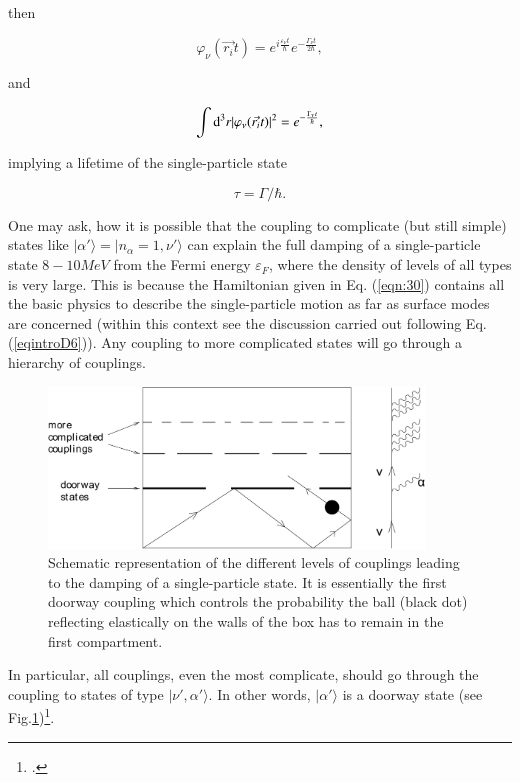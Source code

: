\noindent then

\begin{equation}
\nonumber
\varphi_{\nu}(\vec{r_i} t) = e^{i \frac{\varepsilon_{\nu} t}{\hbar}} e^{- \frac{\Gamma_{\nu} t}{2\hbar}} ,
\end{equation}

\noindent and

\begin{equation}
\int{\rm d}^3 r |\varphi_{\nu} (\vec{r_i} t)|^2 = e^{- \frac{\Gamma_{\nu} t}{\hbar}} ,
\label{eqn:44b}
\end{equation}

\noindent implying a lifetime of the single-particle state

\begin{equation}
\tau = \Gamma/\hbar .
\label{eqn:45}
\end{equation}

One may ask, how it is possible that the coupling to complicate (but still simple) states like $|\alpha'\rangle = |n_\alpha = 1,\nu'\rangle$ can explain the full damping of a single-particle state $8-10 MeV$ from the Fermi energy $\varepsilon_F$, where the density of levels of all types is very large. This is because the Hamiltonian given in Eq. (\ref{eqn:30}) contains all the basic physics to describe the single-particle motion as far as surface modes are concerned (within this context see the discussion carried out following Eq. (\ref{eqintroD6})). Any coupling to more complicated states will go through a hierarchy of couplings.
\begin{figure}[h!]
\centerline {
\includegraphics*[width=10cm]{introduccion/figs/figintroD6}
}
\caption{Schematic representation of the different levels of couplings leading to the damping of a single-particle state. It is essentially the first doorway coupling which controls the probability the ball (black dot) reflecting elastically on the walls of the box has to remain in the first compartment.}
\label{fig:4.6}
\end{figure}
In particular, all couplings, even the most complicate, should go through the coupling to states of type $|\nu',\alpha'\rangle$. In other words, $|\alpha'\rangle$ is a doorway state (see Fig.\ref{fig:4.6})\footnote{\cite{Feshbach:58}.}.

